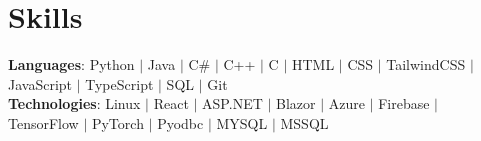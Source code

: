 \section{Skills}
    \begin{itemize}[leftmargin=0.15in, label={}]
	\small{\item{
		\textbf{Languages}{: Python $|$ Java $|$ C\# $|$ C++ $|$ C $|$ HTML $|$ CSS $|$ TailwindCSS $|$ JavaScript $|$ TypeScript $|$ SQL $|$ Git} \\
		\textbf{Technologies}{: Linux $|$ React $|$ ASP.NET $|$ Blazor $|$ Azure $|$ Firebase $|$ TensorFlow $|$ PyTorch $|$ Pyodbc $|$ MYSQL $|$ MSSQL}
	}}
    \end{itemize}